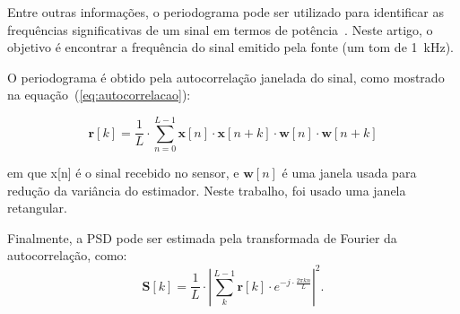 \documentclass{sbrt2017port}
\begin{document}
Entre outras informações, o periodograma pode ser utilizado para identificar as frequências significativas de um sinal em termos de potência~\cite{Jenkins1961GeneralSpectra,Processes2007SpectralPeriodogram}. Neste artigo, o objetivo é encontrar a frequência do sinal emitido pela fonte (um tom de 1~kHz). 

O periodograma é obtido pela autocorrelação janelada do sinal, como mostrado na equação~(\ref{eq:autocorrelacao}):

\begin{equation}\label{eq:autocorrelacao} 
	\mathbold r[k]={\frac{1}{L}} \cdot \sum_{n=0}^{L-1} \mathbold x[n]\cdot \mathbold x[n+k]\cdot \mathbold w[n] \cdot \mathbold w[n+k]
\end{equation}

\noindent em que x[n] é o sinal recebido no sensor, e $\mathbold w[n]$ é uma janela usada para redução da variância do estimador. Neste trabalho, foi usado uma janela retangular. 

Finalmente, a PSD pode ser estimada pela transformada de Fourier da autocorrelação, como:
\begin{equation}
\mathbold {S}[k]= {\frac{1}{L}} \cdot \left|\sum_{k}^{L-1} \mathbold{r}[{k}] \cdot e^{-j\cdot \frac{2\pi kn}{L} } \right|^2.
\end{equation}

%
	
	
	
 
\end{document}
